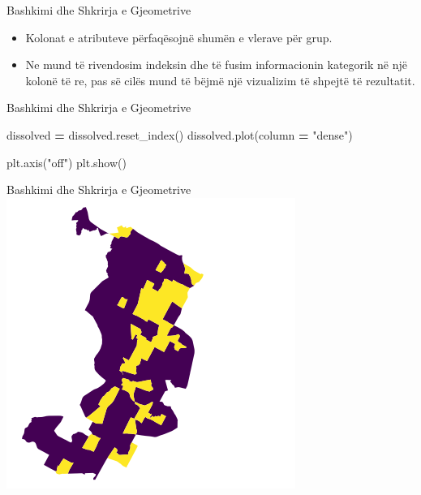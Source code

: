 \documentclass[
  ignorenonframetext,
]{beamer}
\newenvironment{Shaded}{\begin{snugshade}}{\end{snugshade}}
\newcommand{\NormalTok}[1]{#1}
\newcommand{\OperatorTok}[1]{\textcolor[rgb]{0.81,0.36,0.00}{\textbf{#1}}}
\newcommand{\StringTok}[1]{\textcolor[rgb]{0.31,0.60,0.02}{#1}}
\begin{document}
\begin{frame}{Bashkimi dhe Shkrirja e Gjeometrive}
\protect\hypertarget{bashkimi-dhe-shkrirja-e-gjeometrive-11}{}
\begin{itemize}
\item
  Kolonat e atributeve përfaqësojnë shumën e vlerave për grup.
\item
  Ne mund të rivendosim indeksin dhe të fusim informacionin kategorik në
  një kolonë të re, pas së cilës mund të bëjmë një vizualizim të shpejtë
  të rezultatit.
\end{itemize}
\end{frame}

\begin{frame}[fragile]{Bashkimi dhe Shkrirja e Gjeometrive}
\protect\hypertarget{bashkimi-dhe-shkrirja-e-gjeometrive-12}{}

\begin{Shaded}
\begin{Highlighting}[]
\NormalTok{dissolved }\OperatorTok{=}\NormalTok{ dissolved.reset\_index()}
\NormalTok{dissolved.plot(column }\OperatorTok{=} \StringTok{"dense"}\NormalTok{)}

\NormalTok{plt.axis(}\StringTok{"off"}\NormalTok{)}
\NormalTok{plt.show()}
\end{Highlighting}
\end{Shaded}
\end{frame}

\begin{frame}{Bashkimi dhe Shkrirja e Gjeometrive}
\protect\hypertarget{bashkimi-dhe-shkrirja-e-gjeometrive-13}{}
\includegraphics{./Figs/dissolve.png}
\end{frame}
\end{document}
